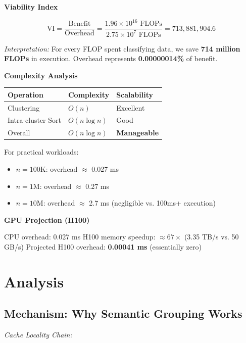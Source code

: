 \documentclass[11pt,twocolumn]{article}
\begin{document}
\textbf{Viability Index}

\begin{equation}
\text{VI} = \frac{\text{Benefit}}{\text{Overhead}} = \frac{1.96 \times 10^{16} \text{ FLOPs}}{2.75 \times 10^{7} \text{ FLOPs}} = 713,881,904.6
\end{equation}

\noindent
\textit{Interpretation:} For every FLOP spent classifying data, we save \textbf{714 million FLOPs} in execution. Overhead represents \textbf{0.00000014\%} of benefit.

\textbf{Complexity Analysis}

\begin{table}[h]
\centering
\small
\begin{tabular}{lll}
\toprule
Operation & Complexity & Scalability \\
\midrule
Clustering & $O(n)$ & Excellent \\
Intra-cluster Sort & $O(n \log n)$ & Good \\
Overall & $O(n \log n)$ & \textbf{Manageable} \\
\bottomrule
\end{tabular}
\end{table}

\noindent
For practical workloads:
\begin{itemize}
\item $n = 100$K: overhead $\approx$ 0.027 ms
\item $n = 1$M: overhead $\approx$ 0.27 ms
\item $n = 10$M: overhead $\approx$ 2.7 ms (negligible vs. 100ms+ execution)
\end{itemize}

\textbf{GPU Projection (H100)}

CPU overhead: 0.027 ms  
H100 memory speedup: $\approx 67\times$ (3.35 TB/s vs. 50 GB/s)  
Projected H100 overhead: \textbf{0.00041 ms} (essentially zero)

\section{Analysis}

\subsection{Mechanism: Why Semantic Grouping Works}

\textit{Cache Locality Chain:}
\end{document}
